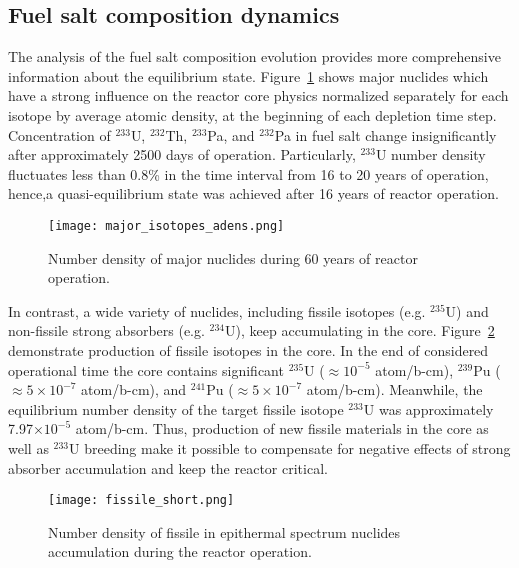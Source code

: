 \subsection{Fuel salt composition dynamics}
The analysis of the fuel salt composition evolution provides more comprehensive 
information about the equilibrium state. Figure~\ref{fig:adens_eq} shows major 
nuclides which have a strong influence on the reactor core physics normalized 
separately for each isotope by average atomic density, at the beginning of each 
depletion time step. Concentration of $^{233}$U, $^{232}$Th, $^{233}$Pa, and 
$^{232}$Pa in fuel salt change insignificantly after approximately 2500 days of 
operation. Particularly, $^{233}$U number density fluctuates less than 0.8\% in 
the time interval from 16 to 20 years of operation, hence,a quasi-equilibrium 
state was achieved after 16 years of reactor operation.
\begin{figure}[ht!] %
  \texttt{[image: major\_isotopes\_adens.png]}
  \caption{Number density of major nuclides during 60 years of reactor 
  operation.}
  \label{fig:adens_eq}
\end{figure}
In contrast, a wide variety of nuclides, including fissile isotopes (e.g. 
$^{235}$U) and non-fissile strong absorbers (e.g. $^{234}$U), keep accumulating 
in the core. Figure~\ref{fig:fissile_short} demonstrate production of fissile 
isotopes in the core. In the end of considered operational time the core 
contains significant $^{235}$U ($\approx10^{-5}$ atom/b-cm), $^{239}$Pu 
($\approx5\times10^{-7}$ atom/b-cm), and $^{241}$Pu ($\approx 5\times10^{-7}$ 
atom/b-cm). Meanwhile, the equilibrium number density of the target fissile 
isotope $^{233}$U was approximately 7.97$\times10^{-5}$ atom/b-cm. Thus, 
production of new fissile materials in the core as well as $^{233}$U breeding 
make it possible to compensate for negative effects of strong absorber 
accumulation and keep the reactor critical.
\begin{figure}[htp!] %
  \texttt{[image: fissile\_short.png]}
  \caption{Number density of fissile in epithermal spectrum nuclides 
  accumulation during the reactor operation.}
  \label{fig:fissile_short}
\end{figure}

